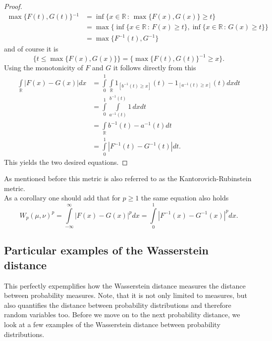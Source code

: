 \documentclass[11pt,a4paper]{article}
\begin{document}
\begin{proof}
\begin{align*}
\max\lbrace{}F(t),G(t)\rbrace{}^{-1}&= \inf\lbrace{}x\in\mathbb{R}\,:\,\max\lbrace{}F(x),G(x)\rbrace\geq{}t\rbrace \\&= \max\lbrace{}\inf\lbrace{}x\in\mathbb{R}\,:\,F(x)\geq{}t\rbrace,\inf\lbrace{}x\in\mathbb{R}\,:\,G(x)\geq{}t\rbrace\rbrace \\&= \max\lbrace{}F^{-1}(t),G^{-1}\rbrace
\end{align*}
and of course it is 
\[
\lbrace{}t\leq{}\max\lbrace{}F(x),G(x)\rbrace\rbrace = \lbrace\max\lbrace{}F(t),G(t)\rbrace^{-1}\geq{}x\rbrace.
\]
Using the monotonicity of $F$ and $G$ it follows directly from this
\begin{align*}
\int\limits_{\mathbb{R}}\left|F(x)-G(x)\right|dx &= \int\limits_{0}^{1}\int\limits_{\mathbb{R}}1_{[b^{-1}(t)\geq{}x]}(t)-1_{[a^{-1}(t)\geq{}x]}(t)dxdt \\&= \int\limits_{0}^{1}\int\limits_{a^{-1}(t)}^{b^{-1}(t)}1\,dxdt \\&= \int\limits_{\mathbb{R}}b^{-1}(t)-a^{-1}(t)dt \\&= \int\limits_{0}^{1}|F^{-1}(t)-G^{-1}(t)|dt.
\end{align*}
This yields the two desired equations. 
\end{proof}
\noindent{}As mentioned before this metric is also referred to as the Kantorovich-Rubinstein metric.\\
As a corollary one should add that for $p\geq{}1$ the same equation also holds
\[
W_p(\mu,\nu)^p = \int\limits_{-\infty}^{\infty}|F(x)-G(x)|^pdx = \int\limits_{0}^{1}|F^{-1}(x)-G^{-1}(x)|^pdx.
\]
\subsection{Particular examples of the Wasserstein distance}
This perfectly expemplifies how the Wasserstein distance measures the distance between probability measures. Note, that it is not only limited to measures, but also quantifies the distance between probability distributions and therefore random variables too. Before we move on to the next probability distance, we look at a few examples of the Wasserstein distance between probability distributions.
\end{document}
